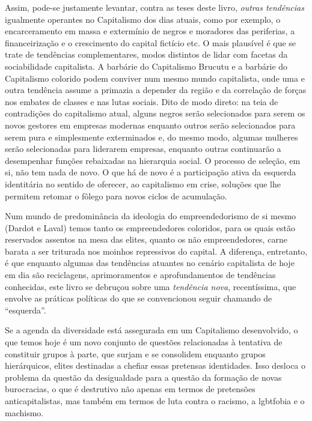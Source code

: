 Assim, pode-se justamente levantar, contra as teses deste livro,
\emph{outras tendências} igualmente operantes no Capitalismo dos dias
atuais, como por exemplo, o encarceramento em massa e extermínio de
negros e moradores das periferias, a financeirização e o crescimento do
capital fictício etc. O mais plausível é que se trate de tendências
complementares, modos distintos de lidar com facetas da sociabilidade
capitalista. A barbárie do Capitalismo Brucutu e a barbárie do
Capitalismo colorido podem conviver num mesmo mundo capitalista, onde
uma e outra tendência assume a primazia a depender da região e da
correlação de forças nos embates de classes e nas lutas sociais. Dito de
modo direto: na teia de contradições do capitalismo atual, alguns negros
serão selecionados para serem os novos gestores em empresas modernas
enquanto outros serão selecionados para serem pura e simplesmente
exterminados e, do mesmo modo, algumas mulheres serão selecionadas para
liderarem empresas, enquanto outras continuarão a desempenhar funções
rebaixadas na hierarquia social. O processo de seleção, em si, não tem
nada de novo. O que há de novo é a participação ativa da esquerda
identitária no sentido de oferecer, ao capitalismo em crise, soluções
que lhe permitem retomar o fôlego para novos ciclos de acumulação.

Num mundo de predominância da ideologia do empreendedorismo de si mesmo
(Dardot e Laval) temos tanto os empreendedores coloridos, para os quais
estão reservados assentos na mesa das elites, quanto os não
empreendedores, carne barata a ser triturada nos moinhos repressivos do
capital. A diferença, entretanto, é que enquanto algumas das tendências
atuantes no cenário capitalista de hoje em dia são reciclagens,
aprimoramentos e aprofundamentos de tendências conhecidas, este livro se
debruçou sobre uma \emph{tendência nova}, recentíssima, que envolve as
práticas políticas do que se convencionou seguir chamando de
``esquerda''.

Se a agenda da diversidade está assegurada em um Capitalismo
desenvolvido, o que temos hoje é um novo conjunto de questões
relacionadas à tentativa de constituir grupos à parte, que surjam e se
consolidem enquanto grupos hierárquicos, elites destinadas a chefiar
essas pretensas identidades. Isso desloca o problema da questão da
desigualdade para a questão da formação de novas burocracias, o que é
destrutivo não apenas em termos de pretensões anticapitalistas, mas
também em termos de luta contra o racismo, a lgbtfobia e o machismo.

